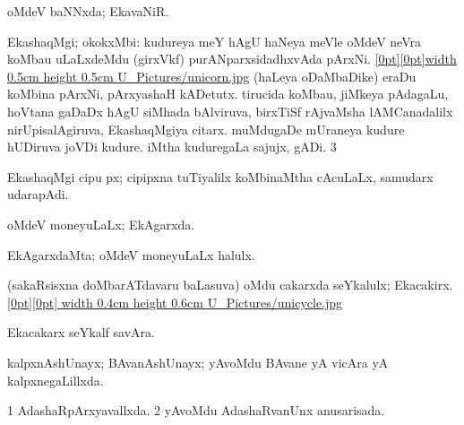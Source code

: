 {\bentry 
{} 
\gl{\gu}
\expl{}
\bmng
oMdeV baNNxda; EkavaNiR. 
\emng
\eentry

\bentry
{} 
\gl{\nA}
\bmng
\bnum
{} EkashaqMgi; okokxMbi: 
\banum
{} kudureya meY hAgU haNeya meVle oMdeV neVra koMbau uLaLxdeMdu (girxVkf) purANparxsidadhxvAda pArxNi. \quad\hyperlink{unicornfigure}{\raisebox{-0.15cm}[0pt][0pt]{\pdfimage width 0.5cm height 0.5cm {U_Pictures/unicorn.jpg}}} 
 (haLeya oDaMbaDike) eraDu koMbina pArxNi, pArxyashaH kADetutx. 
 tirucida koMbau, jiMkeya pAdagaLu, hoVtana gaDaDx hAgU siMhada bAlviruva, birxTiSf rAjvaMsha lAMCanadalilx nirUpisalAgiruva, EkashaqMgiya citarx. 
\eanum
\numie
{} 
\banum
{} muMdugaDe mUraneya kudure hUDiruva joVDi kudure. 
 iMtha kuduregaLa sajujx, gADi. 
\hypertarget{unicorn(3)}{} 
\eanum
\numie
\num{3}  
\enum
\emng

\noindent
\gl{\pagu}
\expl{}
\bmng
{} 
\emng
\eentry

\bentry
{}
\gl{\nA}
\expl{}
\bmng
EkashaqMgi cipu px; cipipxna tuTiyalilx koMbinaMtha cAcuLaLx, samudarx udarapAdi. 
\emng
\eentry

\bentry
{}
\gl{\nA}
\expl{}
\bmng
{} 
\emng
\eentry

\bentry 
{} 
\gl{\gu}
\expl{}
\bmng
oMdeV moneyuLaLx; EkAgarxda. 
\emng
\eentry

\bentry 
{} 
\gl{\nA}
\expl{}
\bmng
EkAgarxdaMta; oMdeV moneyuLaLx halulx. 
\emng
\eentry

\bentry
{} 
\gl{\nA}
\expl{}
\bmng
(sakaRsisxna doMbarATdavaru baLasuva) oMdu cakarxda seYkalulx; Ekacakirx.\quad\hyperlink{unicyclefigure}{\raisebox{-0.15cm}[0pt][0pt] {\pdfimage width 0.4cm height 0.6cm {U_Pictures/unicycle.jpg}}} 
\emng
\eentry

\bentry
{} 
\gl{\nA}
\expl{}
\bmng
Ekacakarx seYkalf savAra. 
\emng
\eentry

\bentry
{} 
\gl{\gu}
\expl{}
\bmng
kalpxnAshUnayx; BAvanAshUnayx; yAvoMdu BAvane yA vicAra yA kalpxnegaLillxda. 
\emng
\eentry

\bentry
{} 
\gl{\gu}
\bmng
\bnum
\num{1} AdashaRpArxyavallxda. 
\num{2} yAvoMdu AdashaRvanUnx anusarisada. 
\enum
\emng
\eentry

}
